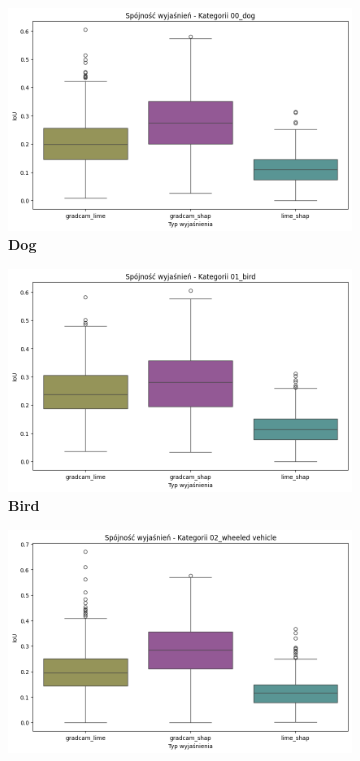 \begin{figure}[h]
	\centering
	\begin{subfigure}[b]{0.3\textwidth}
		\includegraphics[width=.9\textwidth]{img/base_coherence_dog}
		\caption{\textbf{Dog}}  \label{}
	\end{subfigure}
	\begin{subfigure}[b]{0.3\textwidth}
		\centering\includegraphics[width=.9\textwidth]{img/base_coherence_bird}
		\caption{\textbf{Bird}}  \label{}
	\end{subfigure}
	\begin{subfigure}[b]{0.3\textwidth}
		\centering\includegraphics[width=.9\textwidth]{img/base_coherence_vehicle}

\end{subfigure}
\end{figure}
